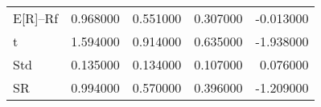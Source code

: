 \begin{tabular}{lrrrr}
\toprule
\midrule
E[R]--Rf & 0.968000 & 0.551000 & 0.307000 & -0.013000 \\
t & 1.594000 & 0.914000 & 0.635000 & -1.938000 \\
Std & 0.135000 & 0.134000 & 0.107000 & 0.076000 \\
SR & 0.994000 & 0.570000 & 0.396000 & -1.209000 \\
\bottomrule
\end{tabular}
